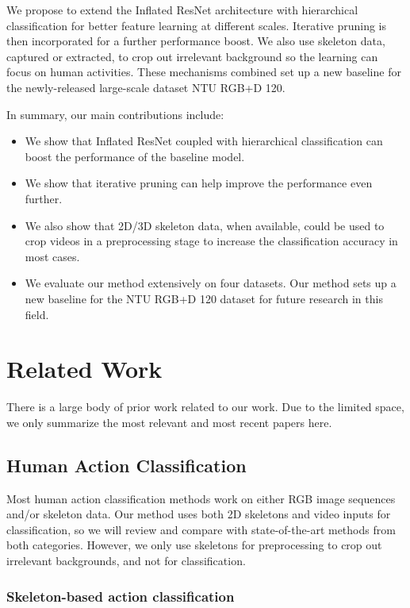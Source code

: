 \documentclass{article}
\begin{document}
{We propose to extend the Inflated ResNet architecture with hierarchical classification for better feature learning at different scales. Iterative pruning is then incorporated for a further performance boost. We also use skeleton data, captured or extracted, to crop out irrelevant background so the learning can focus on human activities. These mechanisms combined set up a new baseline for the newly-released large-scale dataset NTU RGB+D 120.}

{In summary, our main contributions include:
\begin{itemize}
  \item We show that Inflated ResNet coupled with hierarchical classification can boost the performance of the baseline model. 
  \item We show that iterative pruning can help improve the performance even further.
  \item We also show that 2D/3D skeleton data, when available, could be used to crop videos in a preprocessing stage to increase the classification accuracy in most cases.
  \item We evaluate our method extensively on four datasets. Our method sets up a new baseline for the NTU RGB+D 120 dataset for future research in this field.
\end{itemize}}

 \section{Related Work}
{There is a large body of prior work related to our work. Due to the limited space, we only summarize the most relevant and most recent papers here.}

\subsection{Human Action Classification}

{Most human action classification methods work on either RGB image sequences and/or skeleton data. Our method uses both 2D skeletons and video inputs for classification, so we will review and compare with state-of-the-art methods from both categories. However, we only use skeletons for preprocessing to crop out irrelevant backgrounds, and not for classification.} 

\subsubsection{Skeleton-based action classification}
\end{document}
